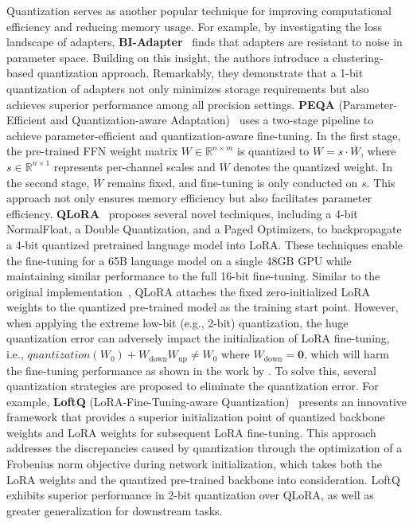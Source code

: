 Quantization serves as another popular technique for improving computational efficiency and reducing memory usage. For example, by investigating the loss landscape of adapters, \textbf{BI-Adapter}~\cite{45-quantization} finds that adapters are resistant to noise in parameter space. Building on this insight, the authors introduce a clustering-based quantization approach. Remarkably, they demonstrate that a 1-bit quantization of adapters not only minimizes storage requirements but also achieves superior performance among all precision settings. 
\textbf{PEQA} (Parameter-Efficient and Quantization-aware Adaptation)~\cite{kim2023memory} uses a two-stage pipeline to achieve parameter-efficient and quantization-aware fine-tuning. In the first stage, the pre-trained FFN weight matrix $W \in \mathbb{R}^{n \times m}$ is quantized to $W = s \cdot \overline{W}$, where $s \in \mathbb{R}^{n \times 1}$ represents per-channel scales and $\overline{W}$ denotes the quantized weight. In the second stage, $\overline{W}$ remains fixed, and fine-tuning is only conducted on $s$. This approach not only ensures memory efficiency but also facilitates parameter efficiency. 
\textbf{QLoRA}~\cite{qlora} proposes several novel techniques, including a 4-bit NormalFloat, a Double Quantization, and a Paged Optimizers, to backpropagate a 4-bit quantized pretrained language model into LoRA. These techniques enable the fine-tuning for a 65B language model on a single 48GB GPU while maintaining similar performance to the full 16-bit fine-tuning. Similar to the original implementation~\cite{5-LoRA}, QLoRA attaches the fixed zero-initialized LoRA weights to the quantized pre-trained model as the training start point. However, when applying the extreme low-bit (e.g., 2-bit) quantization, the huge quantization error can adversely impact the initialization of LoRA fine-tuning, i.e., $quantization(W_0) + W_\text{down}W_\text{up} \neq W_0$ where $W_\text{down} = \mathbf{0}
$, which will harm the fine-tuning performance as shown in the work by \cite{liao2023make}. 
To solve this, several quantization strategies are proposed to eliminate the quantization error. For example, \textbf{LoftQ} (LoRA-Fine-Tuning-aware Quantization)~\cite{loftq} presents an innovative framework that provides a superior initialization point of quantized backbone weights and LoRA weights for subsequent LoRA fine-tuning. This approach addresses the discrepancies caused by quantization through the optimization of a Frobenius norm objective during network initialization, which takes both the LoRA weights and the quantized pre-trained backbone into consideration. LoftQ exhibits superior performance in 2-bit quantization over QLoRA, as well as greater generalization for downstream tasks. 
